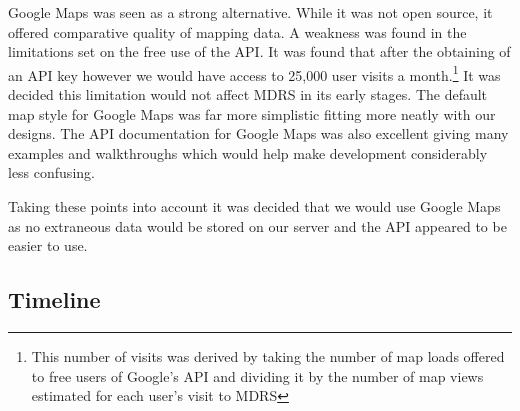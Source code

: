 \documentclass{l3proj}
\begin{document}
Google Maps\cite{googleMaps} was seen as a strong alternative. While it was not open source, it offered comparative quality of mapping data. A weakness was found in the limitations set on the free use of the \gls{API}. It was found that after the obtaining of an API key however we would have access to 25,000 user visits a month.\footnote{This number of visits was derived by taking the number of map loads offered to free users of Google's API and dividing it by the number of map views estimated for each user's visit to MDRS} It was decided this limitation would not affect MDRS in its early stages. The default map style for Google Maps was far more simplistic  fitting more neatly with our designs. The API documentation for Google Maps was also excellent giving many examples and walkthroughs which would help make development considerably less confusing.

Taking these points into account it was decided that we would use Google Maps as no extraneous data would be stored on our server and the API appeared to be easier to use.

\subsection{Timeline}



\end{document}
